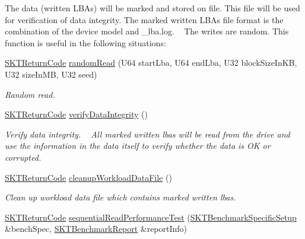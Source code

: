 \begin{DoxyCompactItemize}
\begin{DoxyCompactList}
The data (written L\+B\+As) will be marked and stored on file. This file will be used for verification of data integrity. The marked written L\+B\+As file format is the combination of the device model and \textquotesingle{}\+\_\+lba.\+log\textquotesingle{}. ~\newline
The writes are random. This function is useful in the following situations\+: \end{DoxyCompactList}\item 
\mbox{\hyperlink{_storage_kit_test_delegate_8h_a143844aea21c1ac420c1d0307a69deb7}{S\+K\+T\+Return\+Code}} \mbox{\hyperlink{class_s_k_t_test_delegate_a093e3555e092155feb9c19f40f33e90d}{random\+Read}} (U64 start\+Lba, U64 end\+Lba, U32 block\+Size\+In\+KB, U32 size\+In\+MB, U32 seed)
\begin{DoxyCompactList}\small\item\em Random read. \end{DoxyCompactList}\item 
\mbox{\hyperlink{_storage_kit_test_delegate_8h_a143844aea21c1ac420c1d0307a69deb7}{S\+K\+T\+Return\+Code}} \mbox{\hyperlink{class_s_k_t_test_delegate_a544ac08a737b1045095deb23b8e6ba5d}{verify\+Data\+Integrity}} ()
\begin{DoxyCompactList}\small\item\em Verify data integrity. ~\newline
All marked written lbas will be read from the drive and use the information in the data itself to verify whether the data is OK or corrupted. \end{DoxyCompactList}\item 
\mbox{\hyperlink{_storage_kit_test_delegate_8h_a143844aea21c1ac420c1d0307a69deb7}{S\+K\+T\+Return\+Code}} \mbox{\hyperlink{class_s_k_t_test_delegate_ad25f9f0d4aabe6c159b08c751c3fce6a}{cleanup\+Workload\+Data\+File}} ()
\begin{DoxyCompactList}\small\item\em Clean up workload data file which contains marked written lbas. \end{DoxyCompactList}\item 
\mbox{\hyperlink{_storage_kit_test_delegate_8h_a143844aea21c1ac420c1d0307a69deb7}{S\+K\+T\+Return\+Code}} \mbox{\hyperlink{class_s_k_t_test_delegate_a352d1c5033473624451b30e54117d316}{sequential\+Read\+Performance\+Test}} (\mbox{\hyperlink{struct_s_k_t_benchmark_specific_setup}{S\+K\+T\+Benchmark\+Specific\+Setup}} \&bench\+Spec, \mbox{\hyperlink{struct_s_k_t_benchmark_report}{S\+K\+T\+Benchmark\+Report}} \&report\+Info)

\end{DoxyCompactItemize}
